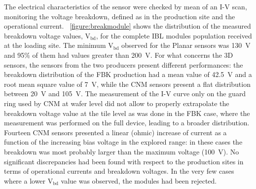 The electrical characteristics of the sensor were checked by mean of an I-V scan, monitoring the voltage breakdown, defined as in the production site and the operational current. 
~\ref{figure:breakmodule} shows the distribution of the measured breakdown voltage values, V$_{\mathrm{bd}}$, for the complete IBL modules population received at the loading site. The minimum V$_{\mathrm{bd}}$ observed for the Planar  sensors was 130~V and 95\% of them had values greater than 200~V. For what concerns the 3D sensors, the sensors from the two producers present different performances: the breakdown distribution of the FBK production had a mean value of 42.5~V and a root mean square value of 7~V, while the CNM sensors present a flat distribution between 20~V and 105~V.
The measurement of the I-V curve only on the guard ring used by CNM at wafer level did not allow to properly extrapolate the breakdown voltage value at the tile level as was done in the FBK case, where the measurement was performed on the full device, leading to a broader distribution. Fourteen CNM sensors presented a linear (ohmic) increase of current as a function of the increasing bias voltage in the explored range: in these cases the breakdown was most probably larger than the maximum voltage (100~V). No significant discrepancies had been found with respect to the production sites in terms of operational currents and breakdown voltages. In the very few cases where a lower V$_{\mathrm{bd}}$ value was observed, the modules had been rejected.
